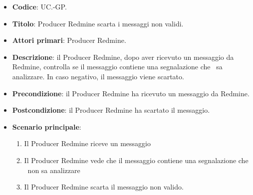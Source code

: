 	\begin{itemize}
		\item \textbf{Codice}: UC\theuccount.\thesubuccount-GP.
		\item \textbf{Titolo}: Producer Redmine scarta i messaggi non validi.
		\item \textbf{Attori primari}: Producer Redmine.
		\item \textbf{Descrizione}: il Producer Redmine, dopo aver ricevuto un messaggio da Redmine, controlla
		se il messaggio contiene una segnalazione che \progetto\ sa analizzare. In caso negativo, il messaggio viene scartato.
		\item \textbf{Precondizione}: il Producer Redmine ha ricevuto un messaggio da Redmine.
		\item \textbf{Postcondizione}: il Producer Redmine ha scartato il messaggio.
		\item \textbf{Scenario principale}:
		\begin{enumerate}
			\item Il Producer Redmine riceve un messaggio
			\item Il Producer Redmine vede che il messaggio contiene una segnalazione che \progetto\ non sa analizzare
			\item Il Producer Redmine scarta il messaggio non valido.
		\end{enumerate}
	\end{itemize}
